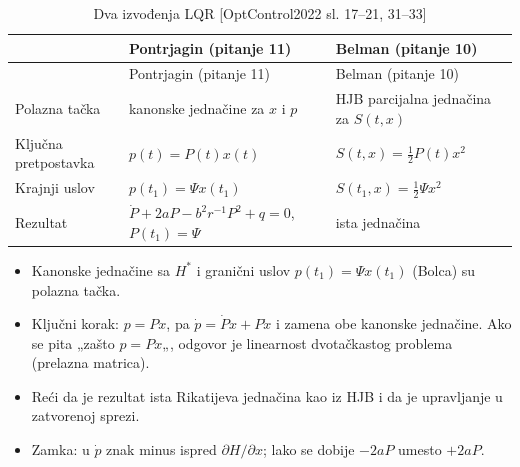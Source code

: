 \documentclass[11pt,a4paper,parskip=half,headsepline,numbers=noenddot]{scrartcl}
\DeclareRobustCommand{\izvor}[1]{{\small\color{izvorC}[#1]}}
\begin{document}
\begin{longtable}[]{@{}
  >{\raggedright\arraybackslash}p{}
  >{\raggedright\arraybackslash}p{}
  >{\raggedright\arraybackslash}p{}@{}}
\caption{Dva izvođenja LQR \izvor{OptControl2022 sl. 17--21, 31--33}}\tabularnewline
\toprule\noalign{}
\begin{minipage}[b]{\linewidth}\raggedright
\end{minipage} & \begin{minipage}[b]{\linewidth}\raggedright
Pontrjagin (pitanje 11)
\end{minipage} & \begin{minipage}[b]{\linewidth}\raggedright
Belman (pitanje 10)
\end{minipage} \\
\midrule\noalign{}
\endfirsthead
\toprule\noalign{}
\begin{minipage}[b]{\linewidth}\raggedright
\end{minipage} & \begin{minipage}[b]{\linewidth}\raggedright
Pontrjagin (pitanje 11)
\end{minipage} & \begin{minipage}[b]{\linewidth}\raggedright
Belman (pitanje 10)
\end{minipage} \\
\midrule\noalign{}
\endhead
\bottomrule\noalign{}
\endlastfoot
Polazna tačka & kanonske jednačine za \(x\) i \(p\) & HJB parcijalna jednačina za \(S(t, x)\) \\
Ključna pretpostavka & \(p(t) = P(t)x(t)\) & \(S(t, x) = \frac12P(t)x^2\) \\
Krajnji uslov & \(p(t_1) = \Psi x(t_1)\) & \(S(t_1, x) = \frac12\Psi x^2\) \\
Rezultat & \(\dot P + 2aP - b^2r^{-1}P^2 + q = 0\), \(P(t_1) = \Psi\) & ista jednačina \\
\end{longtable}

\begin{ispit}[{Pitanje 11}]
\begin{itemize}
\item Kanonske jednačine sa \(H^*\) i granični uslov \(p(t_1) = \Psi x(t_1)\) (Bolca) su polazna tačka.
\item Ključni korak: \(p = Px\), pa \(\dot p = \dot Px + P\dot x\) i zamena obe kanonske jednačine. Ako se pita „zašto \(p = Px\)„, odgovor je linearnost dvotačkastog problema (prelazna matrica).
\item Reći da je rezultat ista Rikatijeva jednačina kao iz HJB i da je upravljanje u zatvorenoj sprezi.
\item Zamka: u \(\dot p\) znak minus ispred \(\partial H/\partial x\); lako se dobije \(-2aP\) umesto \(+2aP\).
\end{itemize}
\end{ispit}
\end{document}
